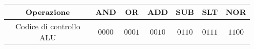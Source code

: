 \documentclass{standalone}
\begin{document}
\begin{tabular}{c|cccccc}
	\toprule
		Operazione & AND & OR & ADD & SUB & SLT & NOR \\\hline
		Codice di controllo ALU & \(0000\) & \(0001\) & \(0010\) & \(0110\) & \(0111\) & \(1100\)\\
	\bottomrule
\end{tabular}
\end{document}
